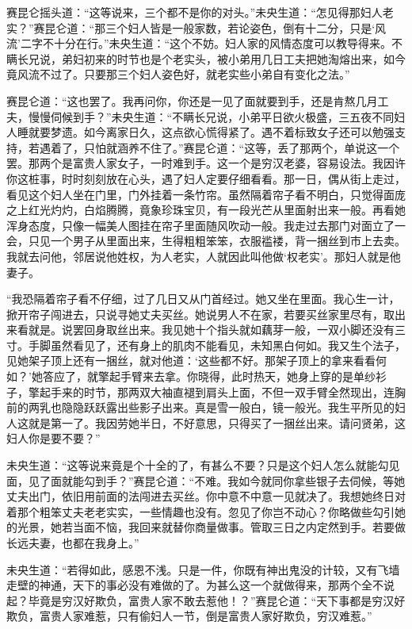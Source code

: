 \documentclass[a4paper,12pt,UTF8,twoside]{ctexbook}
\begin{document}
赛昆仑摇头道：“这等说来，三个都不是你的对头。”未央生道：“怎见得那妇人老实？”赛昆仑道：“那三个妇人皆是一般家数，若论姿色，倒有十二分，只是‘风流’二字不十分在行。”未央生道：“这个不妨。妇人家的风情态度可以教导得来。不瞒长兄说，弟妇初来的时节也是个老实头，被小弟用几日工夫把她淘熔出来，如今竟风流不过了。只要那三个妇人姿色好，就老实些小弟自有变化之法。”

赛昆仑道：“这也罢了。我再问你，你还是一见了面就要到手，还是肯熬几月工夫，慢慢伺候到手？”未央生道：“不瞒长兄说，小弟平日欲火极盛，三五夜不同妇人睡就要梦遗。如今离家日久，这点欲心慌得紧了。遇不着标致女子还可以勉强支持，若遇着了，只怕就涵养不住了。”赛昆仑道：“这等，丢了那两个，单说这一个罢。那两个是富贵人家女子，一时难到手。这一个是穷汉老婆，容易设法。我因许你这桩事，时时刻刻放在心头，遇了妇人定要仔细看看。那一日，偶从街上走过，看见这个妇人坐在门里，门外挂着一条竹帘。虽然隔着帘子看不明白，只觉得面庞之上红光灼灼，白焰腾腾，竟象珍珠宝贝，有一段光芒从里面射出来一般。再看她浑身态度，只像一幅美人图挂在帘子里面随风吹动一般。我走过去那门对面立了一会，只见一个男子从里面出来，生得粗粗笨笨，衣服褴褛，背一捆丝到市上去卖。我就去问他，邻居说他姓权，为人老实，人就因此叫他做‘权老实’。那妇人就是他妻子。

“我恐隔着帘子看不仔细，过了几日又从门首经过。她又坐在里面。我心生一计，掀开帘子闯进去，只说寻她丈夫买丝。她说男人不在家，若要买丝家里尽有，取出来看就是。说罢回身取丝出来。我见她十个指头就如藕芽一般，一双小脚还没有三寸。手脚虽然看见了，还有身上的肌肉不能看见，未知黑白何如。我又生个法子，见她架子顶上还有一捆丝，就对他道：‘这些都不好。那架子顶上的拿来看看何如？’她答应了，就擎起手臂来去拿。你晓得，此时热天，她身上穿的是单纱衫子，擎起手来的时节，那两双大袖直褪到肩头上面，不但一双手臂全然现出，连胸前的两乳也隐隐跃跃露出些影子出来。真是雪一般白，镜一般光。我生平所见的妇人这就是第一了。我因劳她半日，不好意思，只得买了一捆丝出来。请问贤弟，这妇人你是要不要？”

未央生道：“这等说来竟是个十全的了，有甚么不要？只是这个妇人怎么就能勾见面，见了面就能勾到手？”赛昆仑道：“不难。我如今就同你拿些银子去伺候，等她丈夫出门，依旧用前面的法闯进去买丝。你中意不中意一见就决了。我想她终日对着那个粗笨丈夫老老实实，一些情趣也没有。忽见了你岂不动心？你略做些勾引她的光景，她若当面不恼，我回来就替你商量做事。管取三日之内定然到手。若要做长远夫妻，也都在我身上。”

未央生道：“若得如此，感恩不浅。只是一件，你既有神出鬼没的计较，又有飞墙走壁的神通，天下的事必没有难做的了。为甚么这一个就做得来，那两个全不说起？毕竟是穷汉好欺负，富贵人家不敢去惹他！？”赛昆仑道：“天下事都是穷汉好欺负，富贵人家难惹，只有偷妇人一节，倒是富贵人家好欺负，穷汉难惹。”
\end{document}
